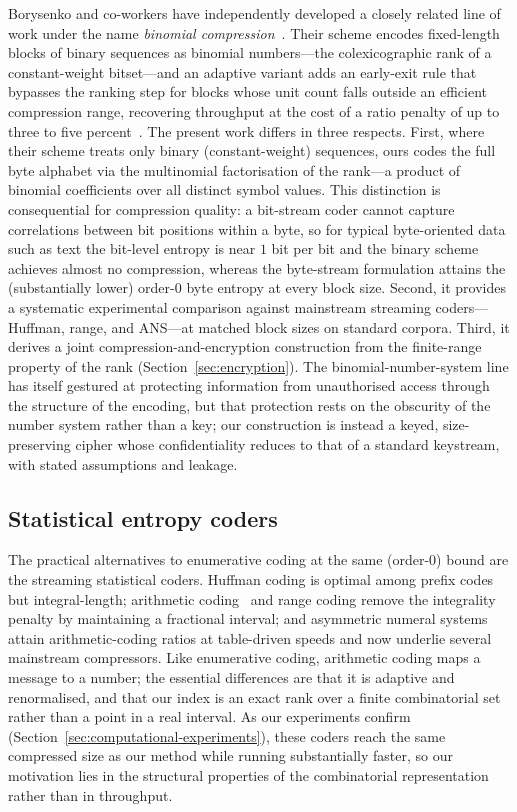 \documentclass[entropy,article,submit,oneauthor,pdftex]{Definitions/mdpi}
\begin{document}
Borysenko and co-workers have independently developed a closely related line
of work under the name \emph{binomial
compression}~\cite{borysenko2021bns,borysenko2022adaptive,kulyk2025speedup}.
Their scheme encodes fixed-length blocks of binary sequences as binomial
numbers---the colexicographic rank of a constant-weight bitset---and an
adaptive variant adds an early-exit rule that bypasses the ranking step for
blocks whose unit count falls outside an efficient compression range,
recovering throughput at the cost of a ratio penalty of up to three to five
percent~\cite{kulyk2025speedup}. The present work differs in three
respects. First, where their scheme treats only binary (constant-weight)
sequences, ours codes the full byte alphabet via the multinomial factorisation
of the rank---a product of binomial coefficients over all distinct symbol values. This distinction is consequential for
compression quality: a bit-stream coder cannot capture correlations between
bit positions within a byte, so for typical byte-oriented data such as text
the bit-level entropy is near $1$ bit per bit and the binary scheme achieves
almost no compression, whereas the byte-stream formulation attains the
(substantially lower) order-$0$ byte entropy at every block size.
Second, it provides a systematic experimental
comparison against mainstream streaming coders---Huffman, range, and
ANS---at matched block sizes on standard corpora. Third, it derives a
joint compression-and-encryption construction from the finite-range property
of the rank (Section~\ref{sec:encryption}). The binomial-number-system line has
itself gestured at protecting information from unauthorised access through the
structure of the encoding, but that protection rests on the obscurity of the number
system rather than a key; our construction is instead a keyed, size-preserving
cipher whose confidentiality reduces to that of a standard keystream, with stated
assumptions and leakage.
\subsection{Statistical entropy coders}
The practical alternatives to enumerative coding at the same (order-$0$) bound are
the streaming statistical coders. Huffman coding is optimal among prefix codes
but integral-length; arithmetic coding~\cite{witten1987arithmetic} and range
coding remove the integrality penalty by maintaining a fractional interval; and
asymmetric numeral systems~\cite{duda2013ans} attain arithmetic-coding ratios at
table-driven speeds and now underlie several mainstream compressors. Like
enumerative coding, arithmetic coding maps a message to a number; the essential
differences are that it is adaptive and renormalised, and that our index is an
exact rank over a finite combinatorial set rather than a point in a real
interval. As our experiments confirm
(Section~\ref{sec:computational-experiments}), these coders reach the same
compressed size as our method while running substantially faster, so our
motivation lies in the structural properties of the combinatorial representation
rather than in throughput.
\end{document}
